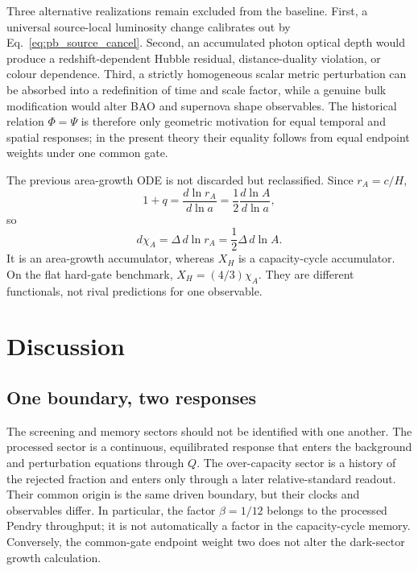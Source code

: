 \documentclass[aps,prd,twocolumn,10pt,superscriptaddress,nofootinbib]{revtex4-2}
\begin{document}
Three alternative realizations remain excluded from the baseline.  First,
a universal source-local luminosity change calibrates out by
Eq.~\eqref{eq:pb_source_cancel}.  Second, an accumulated photon optical depth
would produce a redshift-dependent Hubble residual, distance-duality
violation, or colour dependence.  Third, a strictly homogeneous scalar
metric perturbation can be absorbed into a redefinition of time and scale
factor, while a genuine bulk modification would alter BAO and supernova
shape observables.  The historical relation $\Phi=\Psi$ is therefore only
geometric motivation for equal temporal and spatial responses; in the
present theory their equality follows from equal endpoint weights under one
common gate.

The previous area-growth ODE is not discarded but reclassified.  Since
$r_A=c/H$,
\begin{equation}
1+q=\frac{d\ln r_A}{d\ln a}
=\frac12\frac{d\ln A}{d\ln a},
\end{equation}
so
\begin{equation}
d\chi_A=\Delta\,d\ln r_A
=\frac12\Delta\,d\ln A.
\label{eq:pb_area_accumulator}
\end{equation}
It is an area-growth accumulator, whereas $X_H$ is a capacity-cycle
accumulator.  On the flat hard-gate benchmark,
$X_H=(4/3)\chi_A$.  They are different functionals, not rival predictions
for one observable.


\section{Discussion}
\label{sec:discussion}


\subsection{One boundary, two responses}
\label{sec:one_boundary_two_responses}

The screening and memory sectors should not be identified with one another.
The processed sector is a continuous, equilibrated response that enters the
background and perturbation equations through $Q$.  The over-capacity sector
is a history of the rejected fraction and enters only through a later
relative-standard readout.  Their common origin is the same driven boundary,
but their clocks and observables differ.  In particular, the factor
$\beta=1/12$ belongs to the processed Pendry throughput; it is not
automatically a factor in the capacity-cycle memory.  Conversely, the
common-gate endpoint weight two does not alter the dark-sector growth
calculation.
\end{document}
